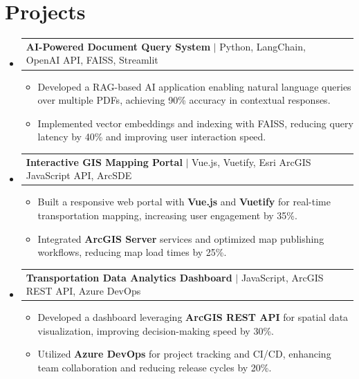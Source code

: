 \documentclass[letterpaper,11pt]{article}
\makeatletter
\newcommand{\resumeItem}[1]{
  \item\footnotesize{
    {#1 \vspace{-2pt}}
  }
}
\newcommand{\resumeProjectHeading}[2]{
    \item
    \begin{tabular*}{1.001\textwidth}{l@{\extracolsep{\fill}}r}
      \small#1 & \textbf{\small #2}\\
    \end{tabular*}\vspace{-7pt}
}
\newcommand{\resumeSubHeadingListStart}{\begin{itemize}[leftmargin=0pt, label={}]}
\newcommand{\resumeSubHeadingListEnd}{\end{itemize}}
\newcommand{\resumeItemListStart}{\begin{itemize}[leftmargin=*]}
\newcommand{\resumeItemListEnd}{\end{itemize}\vspace{-5pt}}
\makeatother
\begin{document}
\section{Projects}
    \vspace{-5pt}
    \resumeSubHeadingListStart

      \resumeProjectHeading
          {\textbf{AI-Powered Document Query System} $|$ Python, LangChain, OpenAI API, FAISS, Streamlit}{ }
        \resumeItemListStart
            \resumeItem{Developed a RAG-based AI application enabling natural language queries over multiple PDFs, achieving 90\% accuracy in contextual responses.}
            \resumeItem{Implemented vector embeddings and indexing with FAISS, reducing query latency by 40\% and improving user interaction speed.}
        \resumeItemListEnd
        \vspace{-12pt}

      \resumeProjectHeading
          {\textbf{Interactive GIS Mapping Portal} $|$ Vue.js, Vuetify, Esri ArcGIS JavaScript API, ArcSDE}{ }
        \resumeItemListStart
            \resumeItem{Built a responsive web portal with \textbf{Vue.js} and \textbf{Vuetify} for real-time transportation mapping, increasing user engagement by 35\%.}
            \resumeItem{Integrated \textbf{ArcGIS Server} services and optimized map publishing workflows, reducing map load times by 25\%.}
        \resumeItemListEnd
        \vspace{-12pt}

      \resumeProjectHeading
          {\textbf{Transportation Data Analytics Dashboard} $|$ JavaScript, ArcGIS REST API, Azure DevOps}{ }
        \resumeItemListStart
            \resumeItem{Developed a dashboard leveraging \textbf{ArcGIS REST API} for spatial data visualization, improving decision-making speed by 30\%.}
            \resumeItem{Utilized \textbf{Azure DevOps} for project tracking and CI/CD, enhancing team collaboration and reducing release cycles by 20\%.}
        \resumeItemListEnd

    \resumeSubHeadingListEnd
\end{document}
